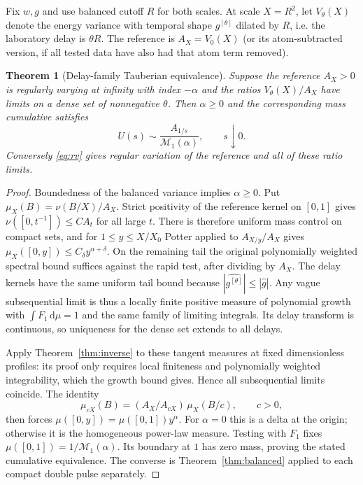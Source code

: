 \documentclass[11pt]{article}
\newtheorem{theorem}{Theorem}[section]
\theoremstyle{remark}
\newcommand{\dd}{\mathrm d}
\begin{document}
Fix \(w,g\) and use balanced cutoff \(R\) for both scales.
At scale \(X=R^2\), let \(V_\theta(X)\) denote the energy
variance with temporal shape \(g^{[\theta]}\) dilated by
\(R\), i.e. the laboratory delay is \(\theta R\).
The reference is \(A_X=V_0(X)\) (or its atom-subtracted
version, if all tested data have also had that atom term
removed).

\begin{theorem}[Delay-family Tauberian equivalence]
\label{thm:converse}
Suppose the reference \(A_X>0\) is regularly varying at
infinity with index \(-\alpha\) and the ratios
\(V_\theta(X)/A_X\) have limits on a dense set of nonnegative
\(\theta\). Then \(\alpha\ge0\) and the corresponding mass
cumulative satisfies
\[
             U(s)\sim
            \frac{A_{1/s}}{\mathcal M_1(\alpha)},\qquad s\downarrow0.
\]
Conversely \eqref{eq:rv} gives regular variation of the
reference and all of these ratio limits.
\end{theorem}

\begin{proof}
Boundedness of the balanced variance implies
\(\alpha\ge0\). Put \(\mu_X(B)=\nu(B/X)/A_X\).
Strict positivity of the reference kernel on \([0,1]\)
gives \(\nu([0,t^{-1}])\le C A_t\) for all large \(t\).
There is therefore uniform mass control on compact sets,
and for \(1\le y\le X/X_0\) Potter applied to
\(A_{X/y}/A_X\) gives
\(\mu_X([0,y])\le C_\delta y^{\alpha+\delta}\).
On the remaining tail the original polynomially
weighted spectral bound suffices against the rapid
test, after dividing by \(A_X\).
The delay kernels have the same uniform tail bound because
\(|\widehat{g^{[\theta]}}|\le|\widehat g|\).
Any vague subsequential limit is thus a locally finite
positive measure of polynomial growth with
\(\int F_1\,\dd\mu=1\) and the same family of limiting
integrals. Its delay transform is continuous, so
uniqueness for the dense set extends to all delays.

Apply Theorem~\ref{thm:inverse} to these tangent measures
at fixed dimensionless profiles: its proof only requires
local finiteness and polynomially weighted integrability,
which the growth bound gives. Hence all subsequential
limits coincide. The identity
\[
 \mu_{cX}(B)=(A_X/A_{cX})\,\mu_X(B/c),\qquad c>0,
\]
then forces \(\mu([0,y])=\mu([0,1])y^\alpha\).
For \(\alpha=0\) this is a delta at the origin; otherwise
it is the homogeneous power-law measure. Testing with
\(F_1\) fixes \(\mu([0,1])=1/\mathcal M_1(\alpha)\).
Its boundary at \(1\) has zero mass, proving the stated
cumulative equivalence. The converse is Theorem~\ref{thm:balanced}
applied to each compact double pulse separately.
\end{proof}
\end{document}
